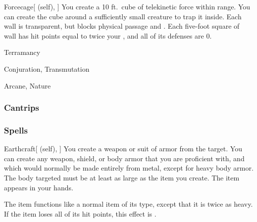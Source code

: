\lowercase{\hypertarget{spell:Forcecage}{}}\label{spell:Forcecage}
\begin{attuneability}[Rank 8]{\hypertarget{spell:Forcecage}{Forcecage}}[ (self), ]
\targetrule
You create a 10 ft.\ cube of telekinetic force within \rngmed range.
You can create the cube around a sufficiently small creature to trap it inside.
Each wall is transparent, but blocks physical passage and .
Each five-foot square of wall has hit points equal to twice your , and all of its defenses are 0.
\end{attuneability}
\vspace{0.25em}


\newpage
\begin{spellsection}{Terramancy}

\begin{spellheader}
\end{spellheader}


 Conjuration, Transmutation

 Arcane, Nature

\subsubsection{Cantrips}


\end{spellsection}


\subsubsection{Spells}


\lowercase{\hypertarget{spell:Earthcraft}{}}\label{spell:Earthcraft}
\begin{attuneability}[Rank 1]{\hypertarget{spell:Earthcraft}{Earthcraft}}[ (self), ]
You create a weapon or suit of armor from the target.
You can create any weapon, shield, or body armor that you are proficient with, and which would normally be made entirely from metal, except for heavy body armor.
The body targeted must be at least as large as the item you create.
The item appears in your hands.

The item functions like a normal item of its type, except that it is twice as heavy.
If the item loses all of its hit points, this effect is .
\end{attuneability}
\vspace{0.25em}



